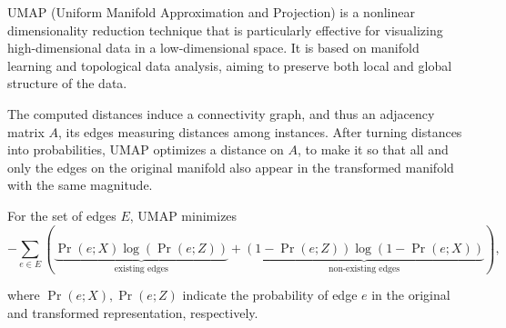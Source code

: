 UMAP (Uniform Manifold Approximation and Projection) is a nonlinear dimensionality reduction technique that is particularly effective for visualizing high-dimensional data in a low-dimensional space. It is based on manifold learning and topological data analysis, aiming to preserve both local and global structure of the data.

The computed distances induce a connectivity graph, and thus an adjacency matrix $A$,
its edges measuring distances among instances. After turning distances into
probabilities, UMAP optimizes a distance on $A$, to make it so that all and only the edges
on the original manifold also appear in the transformed manifold with the same
magnitude.

For the set of edges $E$, UMAP minimizes
\[
-\sum_{e \in E} \left( \underbrace{\Pr(e; X) \log(\Pr(e; Z))}_{\text{existing edges}} + \underbrace{(1 - \Pr(e; Z)) \log(1 - \Pr(e; X))}_{\text{non-existing edges}} \right),
\]

where $\Pr(e; X), \Pr(e; Z)$ indicate the probability of edge $e$ in the original and transformed representation, respectively.
